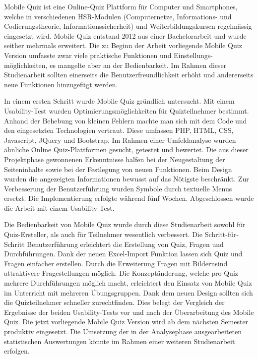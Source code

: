 

Mobile Quiz ist eine Online-Quiz Plattform für Computer und Smartphones, welche in verschiedenen HSR-Modulen (Computernetze, Informations- und Codierungstheorie, Informationssicherheit) und Weiterbildungskursen regelmässig eingesetzt wird. Mobile Quiz entstand 2012 aus einer Bachelorarbeit und wurde seither mehrmals erweitert. Die zu Beginn der Arbeit vorliegende Mobile Quiz Version umfasste zwar viele praktische Funktionen und Einstellungs-möglichkeiten, es mangelte aber an der Bedienbarkeit. Im Rahmen dieser Studienarbeit sollten einerseits die Benutzerfreundlichkeit erhöht und andererseits neue Funktionen hinzugefügt werden.

\bigskip

In einem ersten Schritt wurde Mobile Quiz gründlich untersucht. Mit einem \gls{Usability-Test} wurden Optimierungsmöglichkeiten für Quizteilnehmer bestimmt. Anhand der Behebung von kleinen Fehlern machte man sich mit dem Code und den eingesetzten Technologien vertraut. Diese umfassen PHP, HTML, CSS, Javascript, JQuery und Bootstrap. Im Rahmen einer Umfeldanalyse wurden ähnliche Online Quiz-Plattformen gesucht, getestet und bewertet. Die aus dieser Projektphase gewonnenen Erkenntnisse halfen bei der Neugestaltung der Seiteninhalte sowie bei der Festlegung von neuen Funktionen. Beim Design wurden die angezeigten Informationen bewusst auf das Nötigste beschränkt. Zur Verbesserung der Benutzerführung wurden Symbole durch textuelle Menus ersetzt. Die Implementierung erfolgte während fünf Wochen. Abgeschlossen wurde die Arbeit mit einem Usability-Test.

\bigskip

Die Bedienbarkeit von Mobile Quiz wurde durch diese Studienarbeit sowohl für Quiz-Ersteller, als auch für Teilnehmer wesentlich verbessert. Die Schritt-für-Schritt Benutzerführung erleichtert die Erstellung von Quiz, Fragen und Durchführungen. Dank der neuen Excel-Import Funktion lassen sich Quiz und Fragen einfacher erstellen. Durch die Erweiterung \glqq Fragen mit Bildern\grqq sind attraktivere Fragestellungen möglich. Die Konzeptänderung, welche pro Quiz mehrere Durchführungen möglich macht, erleichtert den Einsatz von Mobile Quiz im Unterricht mit mehreren Übungsgruppen. Dank dem neuen Design sollten sich die Quizteilnehmer schneller zurechtfinden. Dies belegt der Vergleich der Ergebnisse der beiden Usability-Tests vor und nach der Überarbeitung des Mobile Quiz. Die jetzt vorliegende Mobile Quiz Version wird ab dem nächsten Semester produktiv eingesetzt. Die Umsetzung der in der Analysephase ausgearbeiteten statistischen Auswertungen könnte im Rahmen einer weiteren Studienarbeit erfolgen.